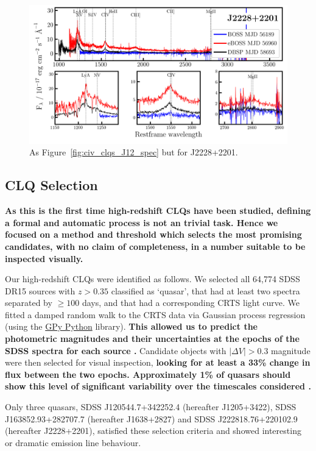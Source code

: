 \documentclass[fleqn,usenatbib]{mnras}
\begin{document}
\begin{figure}
  \centering
  \includegraphics[width=16.7cm, trim=0.3cm 0.0cm  0.30cm 0.1cm, clip]
  {figures/J2228+2201_landscape_spectra.png}
  \vspace{-12pt}
  \caption[]{As Figure~\ref{fig:civ_clqs_J12_spec} but for   J2228+2201.}
  \label{fig:civ_clqs_J22_spec}
\end{figure}

\subsection{CLQ Selection}
{\bf As this is the first time high-redshift CLQs have been studied,
defining a formal and automatic process is not an trivial task.  Hence
we focused on a method and threshold which selects the most promising
candidates, with no claim of completeness, in a number suitable to be
inspected visually.}

Our high-redshift CLQs were identified as follows.  We selected all
64,774 SDSS DR15 sources with $z > 0.35$ classified as `quasar', that
had at least two spectra separated by $\geq 100$ days, and that had a
corresponding CRTS light curve. We fitted a damped random walk to the
CRTS data via Gaussian process regression (using the
\href{https://gpy.readthedocs.io/en/deploy/}{GPy Python} library).
{\bf This allowed us to predict the photometric magnitudes and their
uncertainties at the epochs of the SDSS spectra for each source
\citep[see][]{Rasmussen_Williams2006}.}
Candidate objects with $|\Delta V| > 0.3$ magnitude were then selected
for visual inspection, {\bf looking for at least a 33\% change in flux
between the two epochs. Approximately 1\% of quasars should show this
level of significant variability over the timescales considered
\citep{Graham2017}.}

Only three quasars, SDSS
J120544.7+342252.4 (hereafter J1205+3422), SDSS J163852.93+282707.7
(hereafter J1638+2827) and SDSS J222818.76+220102.9 (hereafter
J2228+2201), satisfied these selection criteria and showed interesting
or dramatic emission line behaviour.
\end{document}

